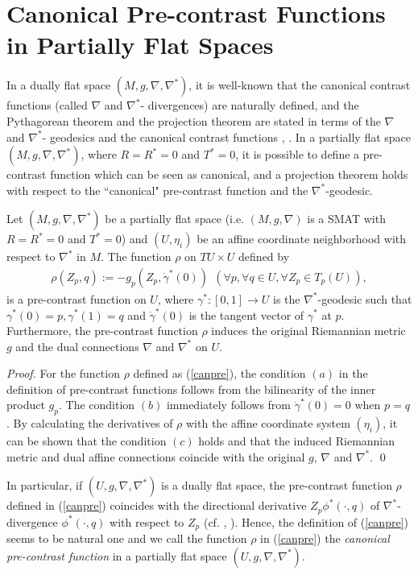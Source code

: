 \documentclass[graybox]{svmult}
\begin{document}
\section{Canonical Pre-contrast Functions in Partially Flat Spaces}
\label{sec:4}
In a dually flat space $(M,g,\nabla,\nabla^{\ast})$, it is well-known that the canonical
contrast functions (called $\nabla$ and $\nabla^{\ast}$- divergences) are naturally
defined, and the Pythagorean theorem and the projection theorem are stated in terms of
the $\nabla$ and $\nabla^{\ast}$- geodesics and the canonical contrast functions \cite{AN},
\cite{A}.
In a partially flat space $(M,g,\nabla,\nabla^{\ast})$, where $R=R^{\ast}=0$ and
$T^{\ast}=0$, it is possible to define a pre-contrast function which can be seen as
canonical, and a projection theorem holds with respect to the ``canonical" pre-contrast
function and the $\nabla^{\ast}$-geodesic.
%
\begin{proposition}
   Let $(M,g,\nabla,\nabla^{\ast})$ be a partially flat space (i.e. $(M,g,\nabla)$
   is a SMAT with $R=R^{\ast}=0$ and $T^{\ast}=0$) and $(U,\eta_i)$ be an affine
   coordinate neighborhood with respect to $\nabla^{\ast}$ in $M$.
   The function $\rho$ on $TU \times U$ defined by
%
\begin{eqnarray}
      \rho(Z_p, q) := - g_p(Z_p, \dot{\gamma}^{\ast}(0)) \ \ 
      (\forall p, \forall q \in U, \forall Z_p \in T_p(U)), \label{canpre}
\end{eqnarray}
%
is a pre-contrast function on $U$,
where $\gamma^{\ast}:[0,1] \rightarrow U$ is the $\nabla^{\ast}$-geodesic such that
$\gamma^{\ast}(0)=p, \gamma^{\ast}(1)=q$ and $\dot{\gamma}^{\ast}(0)$ is the tangent
vector of $\gamma^{\ast}$ at $p$.
Furthermore, the pre-contrast function $\rho$ induces the original Riemannian metric
$g$ and the dual connections $\nabla$ and $\nabla^{\ast}$ on $U$.
\end{proposition}
%
\begin{proof}%
   For the function $\rho$ defined as (\ref{canpre}), the condition $(a)$ in the definition
   of pre-contrast functions follows from the bilinearity of the inner product $g_p$.
   The condition $(b)$ immediately follows from $\dot{\gamma}^{\ast}(0)=0$ when $p=q$.
   By calculating the derivatives of $\rho$ with the affine coordinate system $(\eta_i)$,
   it can be shown that the condition $(c)$ holds and that the induced Riemannian metric
   and dual affine connections coincide with the original $g$, $\nabla$ and $\nabla^{\ast}$.
   \qed
\end{proof}
%
In particular, if $(U,g,\nabla,\nabla^{\ast})$ is a dually flat space, the pre-contrast
function $\rho$ defined in (\ref{canpre}) coincides with the directional derivative
$Z_p\phi^{\ast}(\cdot,q)$ of $\nabla^{\ast}$-divergence $\phi^{\ast}(\cdot,q)$ with
respect to $Z_p$ (cf. \cite{HK}, \cite{AA}).
Hence, the definition of (\ref{canpre}) seems to be natural one and we call the function
$\rho$ in (\ref{canpre}) the {\em canonical pre-contrast function} in a partially flat
space $(U,g,\nabla,\nabla^{\ast})$.
\end{document}
